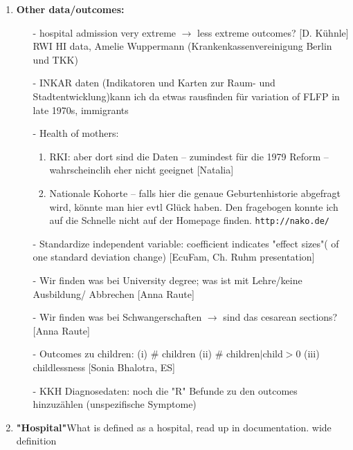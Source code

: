 \documentclass[11pt,a4paper]{article}
\begin{document}
{\begin{enumerate}
\item \textbf{Other data/outcomes:}\vspace{-1 em}
\begin{itemize}
	\item[-] hospital admission very extreme $\rightarrow$ less extreme outcomes? [D. Kühnle] RWI HI data, Amelie Wuppermann (Krankenkassenvereinigung Berlin und TKK)
	\item[-] INKAR daten (Indikatoren und Karten zur Raum- und Stadtentwicklung)\newline kann ich da etwas rausfinden für variation of FLFP in late 1970s, immigrants 
	\item[-] Health of mothers: \vspace{-.5em}
	\begin{enumerate}
		\item RKI: aber dort sind die Daten – zumindest für die 1979 Reform – wahrscheinclih eher nicht geeignet [Natalia]
		\item  Nationale Kohorte – falls hier die genaue Geburtenhistorie abgefragt wird, könnte man hier evtl Glück haben. Den fragebogen konnte ich auf die Schnelle nicht auf der Homepage finden. \texttt{http://nako.de/}
	\end{enumerate}
	\item[-] Standardize independent variable: coefficient indicates "effect sizes"( of one standard deviation change) [EcuFam, Ch. Ruhm presentation]
	\item[-] Wir finden was bei University degree; was ist mit Lehre/keine Ausbildung/ Abbrechen [Anna Raute]
	\item[-] Wir finden was bei Schwangerschaften $\rightarrow$ sind das cesarean sections? [Anna Raute]
	\item[-] Outcomes zu children: (i) \#  children (ii) \# children$|$child$>$0 (iii) childlessness [Sonia Bhalotra, ES]
	\item[-] KKH Diagnosedaten: noch die "R" Befunde zu den outcomes hinzuzählen (unspezifische Symptome)
\end{itemize}


\item \textbf{"Hospital"}\newline What is defined as a hospital, read up in documentation. wide definition



\end{enumerate}}
\end{document}
